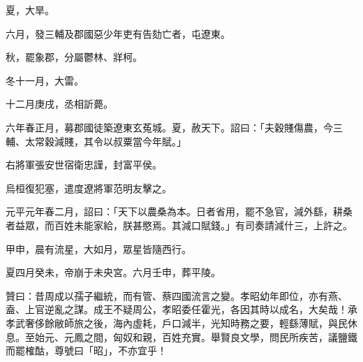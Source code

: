 \begin{pinyinscope}
夏，大旱。

六月，發三輔及郡國惡少年吏有告劾亡者，屯遼東。

秋，罷象郡，分屬鬱林、牂柯。

冬十一月，大雷。

十二月庚戌，丞相訢薨。

六年春正月，募郡國徒築遼東玄菟城。夏，赦天下。詔曰：「夫穀賤傷農，今三輔、太常穀減賤，其令以叔粟當今年賦。」

右將軍張安世宿衛忠謹，封富平侯。

烏桓復犯塞，遣度遼將軍范明友擊之。

元平元年春二月，詔曰：「天下以農桑為本。日者省用，罷不急官，減外繇，耕桑者益眾，而百姓未能家給，朕甚愍焉。其減口賦錢。」有司奏請減什三，上許之。

甲申，晨有流星，大如月，眾星皆隨西行。

夏四月癸未，帝崩于未央宮。六月壬申，葬平陵。

贊曰：昔周成以孺子繼統，而有管、蔡四國流言之變。孝昭幼年即位，亦有燕、盍、上官逆亂之謀。成王不疑周公，孝昭委任霍光，各因其時以成名，大矣哉！承孝武奢侈餘敝師旅之後，海內虛耗，戶口減半，光知時務之要，輕繇薄賦，與民休息。至始元、元鳳之間，匈奴和親，百姓充實。舉賢良文學，問民所疾苦，議鹽鐵而罷榷酤，尊號曰「昭」，不亦宜乎！


\end{pinyinscope}